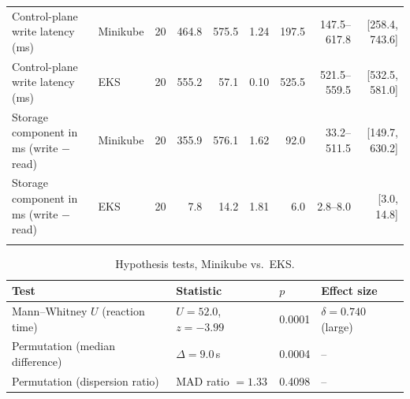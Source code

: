\begin{table}[!t]
\begin{tabular}{@{}llrrrrrrr@{}}
\addlinespace
Control-plane write latency (ms) & Minikube & 20 & 464.8 & 575.5 & 1.24 & 197.5 & 147.5--617.8 & [258.4, 743.6]\\
Control-plane write latency (ms) & EKS & 20 & 555.2 & 57.1 & 0.10 & 525.5 & 521.5--559.5 & [532.5, 581.0]\\
\addlinespace
Storage component in ms (write $-$ read) & Minikube & 20 & 355.9 & 576.1 & 1.62 & 92.0 & 33.2--511.5 & [149.7, 630.2]\\
Storage component in ms (write $-$ read) & EKS & 20 & 7.8 & 14.2 & 1.81 & 6.0 & 2.8--8.0 & [3.0, 14.8]\\
\addlinespace
\bottomrule
\end{tabular}
\end{table}

\begin{table}[!t]
\centering
\caption{Hypothesis tests, Minikube vs.\ EKS.}
\label{tab:testes}
\footnotesize
\begin{tabular}{@{}llll@{}}
\toprule
\textbf{Test} & \textbf{Statistic} & $p$ & \textbf{Effect size}\\
\midrule
Mann--Whitney $U$ (reaction time) & $U=52.0$, $z=-3.99$ & 0.0001 & $\delta=0.740$ (large)\\
Permutation (median difference) & $\Delta=9.0$\,s & 0.0004 & --\\
Permutation (dispersion ratio) & MAD ratio $=1.33$ & 0.4098 & --\\
\bottomrule
\end{tabular}
\end{table}
